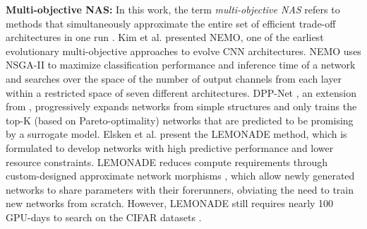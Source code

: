 \documentclass[journal]{IEEEtran}
\theoremstyle{definition}
\theoremstyle{remark}
\begin{document}
\vspace{3pt}
\noindent\textbf{Multi-objective NAS:} {In this work, the term \emph{multi-objective NAS} refers to methods that simultaneously approximate the entire set of efficient trade-off architectures in one run \cite{jin2008pareto,zhu2019multi}.} Kim et al. \cite{kim2017nemo} presented NEMO, one of the earliest evolutionary multi-objective approaches to evolve CNN architectures. NEMO uses NSGA-II \cite{deb2002fast} to maximize classification performance and inference time of a network and searches over the space of the number of output channels from each layer within a restricted space of seven different architectures. DPP-Net \cite{dong2018dpp}, an extension from \cite{liu2018progressive}, progressively expands networks from simple structures and only trains the top-K (based on Pareto-optimality) networks that are predicted to be promising by a surrogate model. Elsken et al. \cite{elsken2018efficient} present the LEMONADE method, which is formulated to develop networks with high predictive performance and lower resource constraints. LEMONADE reduces compute requirements through custom-designed approximate network morphisms \cite{wei2016morhpisms}, which allow newly generated networks to share parameters with their forerunners, obviating the need to train new networks from scratch. However, LEMONADE still requires nearly 100 GPU-days to search on the CIFAR datasets \cite{cifar10}.
\end{document}
